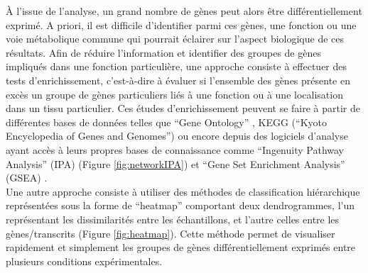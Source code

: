 \documentclass[11pt,a4paper,notrimn]{krantz}
\theoremstyle{definition}
\theoremstyle{definition}
\theoremstyle{remark}
\begin{document}
À l'issue de l'analyse, un grand nombre de gènes peut alors être
différentiellement exprimé. A priori, il est difficile d'identifier
parmi ces gènes, une fonction ou une voie métabolique commune qui
pourrait éclairer sur l'aspect biologique de ces résultats. Afin de
réduire l'information et identifier des groupes de gènes impliqués dans
une fonction particulière, une approche consiste à effectuer des tests
d'enrichissement, c'est-à-dire à évaluer si l'ensemble des gènes
présente en excès un groupe de gènes particuliers liés à une fonction ou
à une localisation dans un tissu particulier. Ces études
d'enrichissement peuvent se faire à partir de différentes bases de
données telles que ``Gene Ontology'' \citep{ashburner_gene_2000}, KEGG
(``Kyoto Encyclopedia of Genes and Genomes'')
\citep{kanehisa_kegg:_2017} ou encore depuis des logiciels d'analyse
ayant accès à leurs propres bases de connaissance comme ``Ingenuity
Pathway Analysis'' (IPA) (Figure \ref{fig:networkIPA}) et ``Gene Set
Enrichment Analysis'' (GSEA) \citep{subramanian_gene_2005}.\\
Une autre approche consiste à utiliser des méthodes de classification
hiérarchique représentées sous la forme de ``heatmap'' comportant deux
dendrogrammes, l'un représentant les dissimilarités entre les
échantillons, et l'autre celles entre les gènes/transcrits (Figure
\ref{fig:heatmap}). Cette méthode permet de visualiser rapidement et
simplement les groupes de gènes différentiellement exprimés entre
plusieurs conditions expérimentales.
\end{document}
